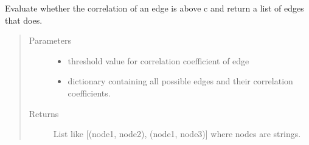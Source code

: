 \documentclass[letterpaper,10pt,english]{sphinxmanual}
\begin{document}
\begin{fulllineitems}
\label{\detokenize{clustering:clustering.createEdges}}
\sphinxAtStartPar
Evaluate whether the correlation of an edge is above c and return     a list of edges that does.
\begin{quote}\begin{description}
\item[{Parameters}] \leavevmode\begin{itemize}
\item {} 
\sphinxAtStartPar
{} \textendash{} threshold value for correlation coefficient of edge

\item {} 
\sphinxAtStartPar
{} \textendash{} dictionary containing all possible edges and their correlation coefficients.

\end{itemize}

\item[{Returns}] \leavevmode
\sphinxAtStartPar
List like {[}(node1, node2), (node1, node3){]} where nodes are strings.

\end{description}\end{quote}

\end{fulllineitems}

\end{document}
